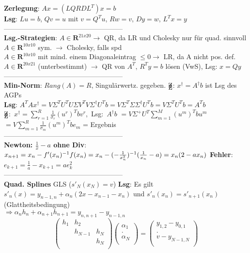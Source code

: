 \textbf{Zerlegung}: $Ax = (LQRDL^T)x = b$\\
\textbf{Lsg}: $Lu = b$, $Qv = u$ mit $v = Q^Tu$, $Rw = v$, $Dy = w$, $L^Tx = y$\\
-----------------------------------------------------\\
\textbf{Lsg.-Strategien}: $A \in \mathbf{R}^{21x20} \rightarrow$ QR,
da LR und Cholesky nur für quad. sinnvoll\\
$A \in \mathbf{R}^{10x10}$ sym. $\rightarrow$ Cholesky, falls spd\\
$A \in \mathbf{R}^{10x10}$ mit mind. einem Diagonaleintrag $\leq 0 \rightarrow$ LR, da A nicht pos. def.\\
$A \in \mathbf{R}^{20x21}$ (unterbestimmt) $\rightarrow$ QR von $A^T$, $R^Ty = b$ lösen (VwS), Lsg: $x = Qy$\\
-----------------------------------------------------\\
\textbf{Min-Norm}: $Rang(A) = R$, Singulärwertz. gegeben. $\mathrm{Z\kern-.6em\raise-0.7ex\hbox{Z}}$: $ x^{\dagger} = A^{\dagger}b$ ist Lsg des AGPs\\
\textbf{Lsg}: $A^TAx^{\dagger} = V \Sigma^T U^T U \Sigma V^T V \Sigma^{\dagger} U^T b = V \Sigma^T \Sigma \Sigma^{\dagger} U^T b = V \Sigma^T U^T b = A^T b$\\
\mbox{$\mathrm{Z\kern-.6em\raise-0.7ex\hbox{Z}}$: $ x^{\dagger} = \sum_{r=1}^R \frac{1}{\sigma_r}(u^r)^Tbv^r$, Lsg: $A^{\dagger}b$} $= V \Sigma^{+}U^T \sum_{m=1}^M (u^m)^T b u^m$\\
$= V \sum_{m=1}^R \frac{1}{\sigma_m} (u^m)^T b e_m$ = Ergebnis\\
-----------------------------------------------------\\
\textbf{Newton: $\frac{1}{x} - a$ ohne Div}: $x_{n+1} = x_n \\- f'(x_n)^{-1} f(x_n) = x_n - (-\frac{1}{x_n^2})^{-1}(\frac{1}{x_n} - a) = x_n(2 - ax_n)$ \textbf{Fehler}: $e_{k+1} = \frac{1}{a} - x_{k+1} = ae_k^2$\\
-----------------------------------------------------\\
\textbf{Quad. Splines} GLS ($s'_N(x_N) = v$) \textbf{Lsg}: Es gilt $s'_n(x) = y_{n-1,n} + \alpha_n(2x - x_{n-1} - x_n)$ und $s'_n(x_n) = s'_{n+1}(x_n)$ (Glattheitsbedingung) \\ 
$\Rightarrow \alpha_n h_n + \alpha_{n+1} h_{n+1} = y_{n,n + 1} - y_{n-1, n}$\\
\[\left(\begin{array}{ccc}
h_1 & h_2 & \\
 & h_{N-1} & h_N \\
 &  & h_N \\
\end{array}\right)
\left(\begin{array}{c}
\alpha_{1}\\
.\\
\alpha_{N}\\
\end{array}\right) = 
\left(\begin{array}{c}
y_{1,2} - y_{0,1}\\
.\\
v - y_{N-1,N}\\
\end{array}\right)
\]
